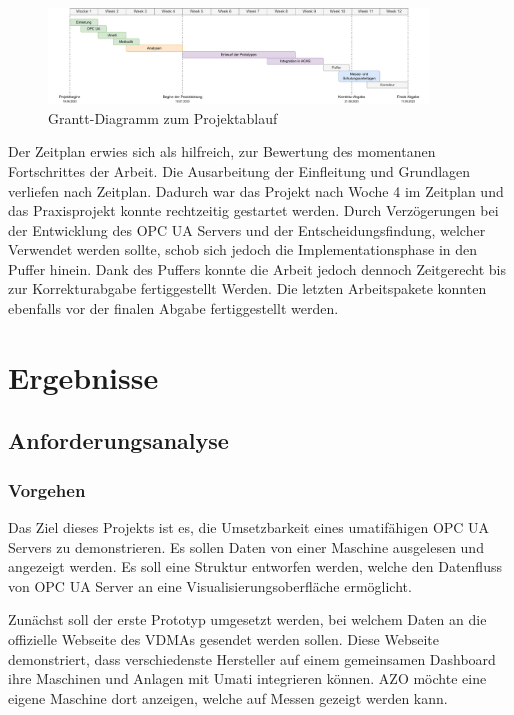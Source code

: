 \documentclass[a4paper, 12pt, oneside, toc=listofnumbered, bibliography=totoc]{scrbook}
\begin{document}
	\begin{figure}[H]
		\centering
		\includegraphics[width=0.9\textwidth]{res/analysen/Grantt-Diagramm.pdf}
		\caption{Grantt-Diagramm zum Projektablauf}
		\label{fig:Grantt}
	\end{figure}
	
	Der Zeitplan erwies sich als hilfreich, zur Bewertung des momentanen Fortschrittes der Arbeit. Die Ausarbeitung der Einfleitung und Grundlagen verliefen nach Zeitplan. Dadurch war das Projekt nach Woche 4 im Zeitplan und das Praxisprojekt konnte rechtzeitig gestartet werden. Durch Verzögerungen bei der Entwicklung des OPC UA Servers und der Entscheidungsfindung, welcher Verwendet werden sollte, schob sich jedoch die Implementationsphase in den Puffer hinein. Dank des Puffers konnte die Arbeit jedoch dennoch Zeitgerecht bis zur Korrekturabgabe fertiggestellt Werden. Die letzten Arbeitspakete konnten ebenfalls vor der finalen Abgabe fertiggestellt werden.  
	
\chapter{Ergebnisse}\label{ch:Ergebnisse}
	
	
	\section{Anforderungsanalyse}
		
		\subsection{Vorgehen}
		Das Ziel dieses Projekts ist es, die Umsetzbarkeit eines umatifähigen OPC UA Servers zu demonstrieren. Es sollen Daten von einer Maschine ausgelesen und angezeigt werden. Es soll eine Struktur entworfen werden, welche den Datenfluss von OPC UA Server an eine Visualisierungsoberfläche ermöglicht.
		
		Zunächst soll der erste Prototyp umgesetzt werden, bei welchem Daten an die offizielle Webseite des VDMAs gesendet werden sollen. Diese Webseite demonstriert, dass verschiedenste Hersteller auf einem gemeinsamen Dashboard ihre Maschinen und Anlagen mit Umati integrieren können. AZO möchte eine eigene Maschine dort anzeigen, welche auf Messen gezeigt werden kann.
		
\end{document}
